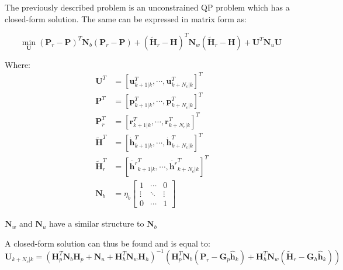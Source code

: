 \-The previously described problem is an unconstrained \-Q\-P problem which has a closed-\/form solution. \-The same can be expressed in matrix form as\-:

\[ \underset{\mathbf{U}}{\text{min}} \; (\mathbf{P}_r - \mathbf{P})^T \mathbf{N}_b (\mathbf{P}_r - \mathbf{P}) + (\tilde{\mathbf{H}}_r - \mathbf{H})^T\mathbf{N}_w(\tilde{\mathbf{H}}_r - \mathbf{H}) + \mathbf{U}^T\mathbf{N}_u \mathbf{U} \]

\-Where\-: \begin{align*} \mathbf{U}^T &= \left[ \mathbf{u}^T_{k+1|k}, \cdots, \mathbf{u}^T_{k+N_c|k} \right]^T \\ \mathbf{P}^T &= \left[ \mathbf{p}^T_{k+1|k}, \cdots, \mathbf{p}^T_{k+N_c|k} \right]^T \\ \mathbf{P}^T_r &= \left[ \mathbf{r}^T_{k+1|k}, \cdots, \mathbf{r}^T_{k+N_c|k} \right]^T \\ \mathbf{\tilde{H}}^T &= \left[ \dot{\mathbf{h}}^T_{k+1|k}, \cdots, \dot{\mathbf{h}}^T_{k+N_c|k} \right]^T \\ \mathbf{\tilde{H}}^T_r &= \left[ \dot{\mathbf{h}^r}^T_{k+1|k}, \cdots, \dot{\mathbf{h}^r}^T_{k+N_c|k} \right]^T \\ \mathbf{N}_b &= \eta_b\left[\begin{array}{ccc} 1 & \cdots & 0 \\ \vdots & \ddots & \vdots\\ 0 & \cdots & 1 \end{array}\right] \end{align*}

$\mathbf{N}_w$ and $\mathbf{N}_u$ have a similar structure to $\mathbf{N}_b$

\-A closed-\/form solution can thus be found and is equal to\-: \[ \mathbf{U}_{k+N_c|k} = (\mathbf{H}_p^T \mathbf{N}_b \mathbf{H}_p + \mathbf{N}_u + \mathbf{H}_h^T \mathbf{N}_w \mathbf{H}_h)^{-1} \left(\mathbf{H}^T_p \mathbf{N}_b (\mathbf{P}_r - \mathbf{G}_p \hat{\mathbf{h}}_k) + \mathbf{H}^T_h\mathbf{N}_w(\tilde{\mathbf{H}}_r - \mathbf{G}_h \hat{\mathbf{h}}_k)\right) \] 

